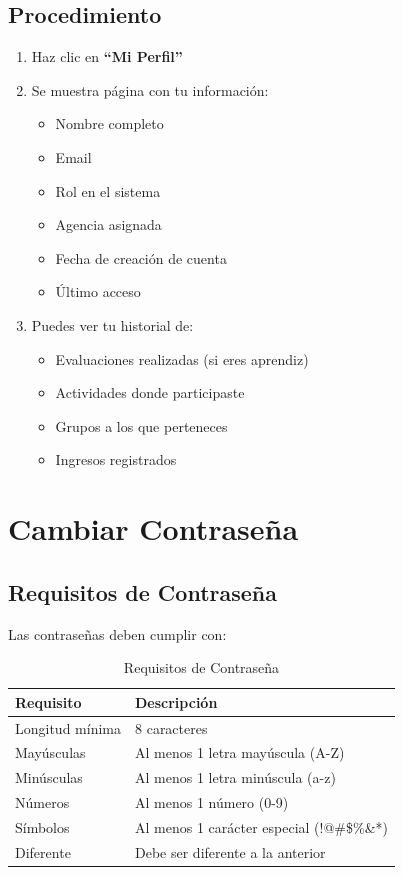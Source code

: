\documentclass[12pt,a4paper,spanish,oneside]{report}
\begin{document}
\subsection{Procedimiento}

\begin{enumerate}
\item Haz clic en \textbf{``Mi Perfil''}
\item Se muestra página con tu información:
\begin{itemize}
\item Nombre completo
\item Email
\item Rol en el sistema
\item Agencia asignada
\item Fecha de creación de cuenta
\item Último acceso
\end{itemize}
\item Puedes ver tu historial de:
\begin{itemize}
\item Evaluaciones realizadas (si eres aprendiz)
\item Actividades donde participaste
\item Grupos a los que perteneces
\item Ingresos registrados
\end{itemize}
\end{enumerate}

\section{Cambiar Contraseña}

\subsection{Requisitos de Contraseña}

Las contraseñas deben cumplir con:

\begin{table}[H]
\centering
\caption{Requisitos de Contraseña}
\begin{tabular}{|l|p{7cm}|}
\hline
\textbf{Requisito} & \textbf{Descripción} \\
\hline
Longitud mínima & 8 caracteres \\
\hline
Mayúsculas & Al menos 1 letra mayúscula (A-Z) \\
\hline
Minúsculas & Al menos 1 letra minúscula (a-z) \\
\hline
Números & Al menos 1 número (0-9) \\
\hline
Símbolos & Al menos 1 carácter especial (!@\#\$\%\&*) \\
\hline
Diferente & Debe ser diferente a la anterior \\
\hline
\end{tabular}
\end{table}
\end{document}
